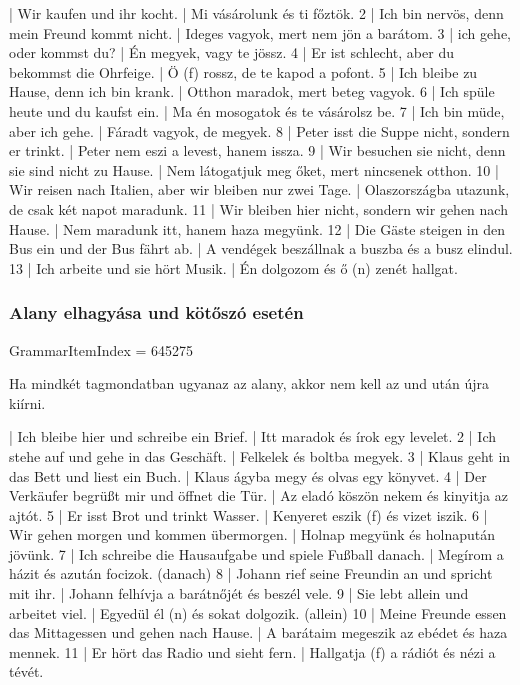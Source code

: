 \documentclass{article}
\newenvironment{desc}{\verbatim}{\endverbatim}
\newenvironment{exmp}{\verbatim}{\endverbatim}
\begin{document}
\begin{exmp}
1 | Wir kaufen und ihr kocht. | Mi vásárolunk és ti főztök.
2 | Ich bin nervös, denn mein Freund kommt nicht. | Ideges vagyok, mert nem jön a barátom.
3 | ich gehe, oder kommst du? | Én megyek, vagy te jössz.
4 | Er ist schlecht, aber du bekommst die Ohrfeige. | Ö (f) rossz, de te kapod a pofont.
5 | Ich bleibe zu Hause, denn ich bin krank. | Otthon maradok, mert beteg vagyok.
6 | Ich spüle heute und du kaufst ein. | Ma én mosogatok és te vásárolsz be.
7 | Ich bin müde, aber ich gehe. | Fáradt vagyok, de megyek.
8 | Peter isst die Suppe nicht, sondern er trinkt. | Peter nem eszi a levest, hanem issza.
9 | Wir besuchen sie nicht, denn sie sind nicht zu Hause. | Nem látogatjuk meg őket, mert nincsenek otthon.
10 | Wir reisen nach Italien, aber wir bleiben nur zwei Tage. | Olaszországba utazunk, de csak két napot maradunk.
11 | Wir bleiben hier nicht, sondern wir gehen nach Hause. | Nem maradunk itt, hanem haza megyünk.
12 | Die Gäste steigen in den Bus ein und der Bus fährt ab. | A vendégek beszállnak a buszba és a busz elindul.
13 | Ich arbeite und sie hört Musik. | Én dolgozom és ő (n) zenét hallgat.
\end{exmp}

\subsubsection{Alany elhagyása und kötőszó esetén}

GrammarItemIndex = 645275

\begin{desc}
Ha mindkét tagmondatban ugyanaz az alany, akkor nem kell az und után újra kiírni.
\end{desc}

\begin{exmp}
1 | Ich bleibe hier und schreibe ein Brief. | Itt maradok és írok egy levelet.
2 | Ich stehe auf und gehe in das Geschäft. | Felkelek és boltba megyek.
3 | Klaus geht in das Bett und liest ein Buch. | Klaus ágyba megy és olvas egy könyvet.
4 | Der Verkäufer begrüßt mir und öffnet die Tür. | Az eladó köszön nekem és kinyitja az ajtót.
5 | Er isst Brot und trinkt Wasser. | Kenyeret eszik (f) és vizet iszik.
6 | Wir gehen morgen und kommen übermorgen. | Holnap megyünk és holnapután jövünk.
7 | Ich schreibe die Hausaufgabe und spiele Fußball danach. | Megírom a házit és azután focizok. (danach)
8 | Johann rief seine Freundin an und spricht mit ihr. | Johann felhívja a barátnőjét és beszél vele.
9 | Sie lebt allein und arbeitet viel. | Egyedül él (n) és sokat dolgozik. (allein)
10 | Meine Freunde essen das Mittagessen und gehen nach Hause. | A barátaim megeszik az ebédet és haza mennek.
11 | Er hört das Radio und sieht fern. | Hallgatja (f) a rádiót és nézi a tévét.
\end{exmp}
\end{document}
